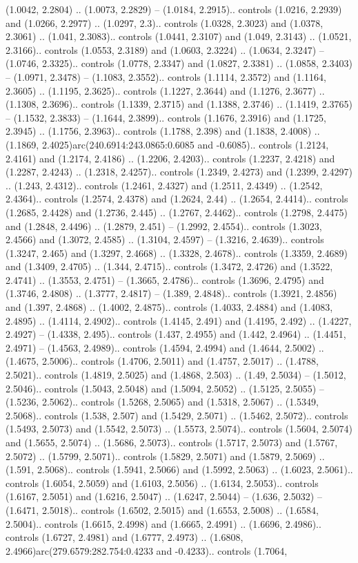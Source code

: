 (1.0042, 2.2804) .. (1.0073, 2.2829) -- (1.0184, 2.2915).. controls (1.0216, 2.2939) and (1.0266, 2.2977) .. (1.0297, 2.3).. controls (1.0328, 2.3023) and (1.0378, 2.3061) .. (1.041, 2.3083).. controls (1.0441, 2.3107) and (1.049, 2.3143) .. (1.0521, 2.3166).. controls (1.0553, 2.3189) and (1.0603, 2.3224) .. (1.0634, 2.3247) -- (1.0746, 2.3325).. controls (1.0778, 2.3347) and (1.0827, 2.3381) .. (1.0858, 2.3403) -- (1.0971, 2.3478) -- (1.1083, 2.3552).. controls (1.1114, 2.3572) and (1.1164, 2.3605) .. (1.1195, 2.3625).. controls (1.1227, 2.3644) and (1.1276, 2.3677) .. (1.1308, 2.3696).. controls (1.1339, 2.3715) and (1.1388, 2.3746) .. (1.1419, 2.3765) -- (1.1532, 2.3833) -- (1.1644, 2.3899).. controls (1.1676, 2.3916) and (1.1725, 2.3945) .. (1.1756, 2.3963).. controls (1.1788, 2.398) and (1.1838, 2.4008) .. (1.1869, 2.4025)arc(240.6914:243.0865:0.6085 and -0.6085).. controls (1.2124, 2.4161) and (1.2174, 2.4186) .. (1.2206, 2.4203).. controls (1.2237, 2.4218) and (1.2287, 2.4243) .. (1.2318, 2.4257).. controls (1.2349, 2.4273) and (1.2399, 2.4297) .. (1.243, 2.4312).. controls (1.2461, 2.4327) and (1.2511, 2.4349) .. (1.2542, 2.4364).. controls (1.2574, 2.4378) and (1.2624, 2.44) .. (1.2654, 2.4414).. controls (1.2685, 2.4428) and (1.2736, 2.445) .. (1.2767, 2.4462).. controls (1.2798, 2.4475) and (1.2848, 2.4496) .. (1.2879, 2.451) -- (1.2992, 2.4554).. controls (1.3023, 2.4566) and (1.3072, 2.4585) .. (1.3104, 2.4597) -- (1.3216, 2.4639).. controls (1.3247, 2.465) and (1.3297, 2.4668) .. (1.3328, 2.4678).. controls (1.3359, 2.4689) and (1.3409, 2.4705) .. (1.344, 2.4715).. controls (1.3472, 2.4726) and (1.3522, 2.4741) .. (1.3553, 2.4751) -- (1.3665, 2.4786).. controls (1.3696, 2.4795) and (1.3746, 2.4808) .. (1.3777, 2.4817) -- (1.389, 2.4848).. controls (1.3921, 2.4856) and (1.397, 2.4868) .. (1.4002, 2.4875).. controls (1.4033, 2.4884) and (1.4083, 2.4895) .. (1.4114, 2.4902).. controls (1.4145, 2.491) and (1.4195, 2.492) .. (1.4227, 2.4927) -- (1.4338, 2.495).. controls (1.437, 2.4955) and (1.442, 2.4964) .. (1.4451, 2.4971) -- (1.4563, 2.4989).. controls (1.4594, 2.4994) and (1.4644, 2.5002) .. (1.4675, 2.5006).. controls (1.4706, 2.5011) and (1.4757, 2.5017) .. (1.4788, 2.5021).. controls (1.4819, 2.5025) and (1.4868, 2.503) .. (1.49, 2.5034) -- (1.5012, 2.5046).. controls (1.5043, 2.5048) and (1.5094, 2.5052) .. (1.5125, 2.5055) -- (1.5236, 2.5062).. controls (1.5268, 2.5065) and (1.5318, 2.5067) .. (1.5349, 2.5068).. controls (1.538, 2.507) and (1.5429, 2.5071) .. (1.5462, 2.5072).. controls (1.5493, 2.5073) and (1.5542, 2.5073) .. (1.5573, 2.5074).. controls (1.5604, 2.5074) and (1.5655, 2.5074) .. (1.5686, 2.5073).. controls (1.5717, 2.5073) and (1.5767, 2.5072) .. (1.5799, 2.5071).. controls (1.5829, 2.5071) and (1.5879, 2.5069) .. (1.591, 2.5068).. controls (1.5941, 2.5066) and (1.5992, 2.5063) .. (1.6023, 2.5061).. controls (1.6054, 2.5059) and (1.6103, 2.5056) .. (1.6134, 2.5053).. controls (1.6167, 2.5051) and (1.6216, 2.5047) .. (1.6247, 2.5044) -- (1.636, 2.5032) -- (1.6471, 2.5018).. controls (1.6502, 2.5015) and (1.6553, 2.5008) .. (1.6584, 2.5004).. controls (1.6615, 2.4998) and (1.6665, 2.4991) .. (1.6696, 2.4986).. controls (1.6727, 2.4981) and (1.6777, 2.4973) .. (1.6808, 2.4966)arc(279.6579:282.754:0.4233 and -0.4233).. controls (1.7064, 